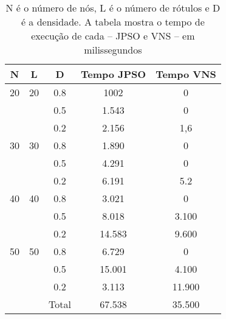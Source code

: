 \documentclass{sig-alternate-05-2015}
\begin{document}
\begin{table}
	
	\begin{tabular}{ccccc}
		
		\hline \rule[-2ex]{0pt}{5.5ex} N & L & D & Tempo JPSO& Tempo VNS  \\ 
		\hline \rule[-2ex]{0pt}{5.5ex} 20 & 20 & 0.8 & 1002 & 0\\ 
		\rule[-2ex]{0pt}{5.5ex}  &  & 0.5 & 1.543 &  0\\ 
		\rule[-2ex]{0pt}{5.5ex}  &  & 0.2 & 2.156 & 1,6\\
		\rule[-2ex]{0pt}{5.5ex} 30 & 30 & 0.8 & 1.890 & 0\\ 
		\rule[-2ex]{0pt}{5.5ex}  &  & 0.5 & 4.291 & 0\\
		\rule[-2ex]{0pt}{5.5ex}  &  & 0.2 & 6.191 & 5.2\\
		\rule[-2ex]{0pt}{5.5ex} 40 & 40 & 0.8 & 3.021 & 0\\ 
		\rule[-2ex]{0pt}{5.5ex}  &  & 0.5 & 8.018 & 3.100\\  
		\rule[-2ex]{0pt}{5.5ex}  &  & 0.2 & 14.583 & 9.600\\
		\rule[-2ex]{0pt}{5.5ex} 50 & 50 & 0.8 & 6.729 & 0\\
		\rule[-2ex]{0pt}{5.5ex}  &  & 0.5 & 15.001 & 4.100\\
		\rule[-2ex]{0pt}{5.5ex}  &  & 0.2 & 3.113 & 11.900\\
		\hline \rule[-2ex]{0pt}{5.5ex}  &  & Total & 67.538 & 35.500\\
		\hline
	\end{tabular}
	\caption{N é o número de nós, L é o número de rótulos e D é a densidade.  A tabela mostra o tempo de execução de cada -- JPSO e VNS -- em milissegundos}
	\label{tab2}
\end{table}
\end{document}
